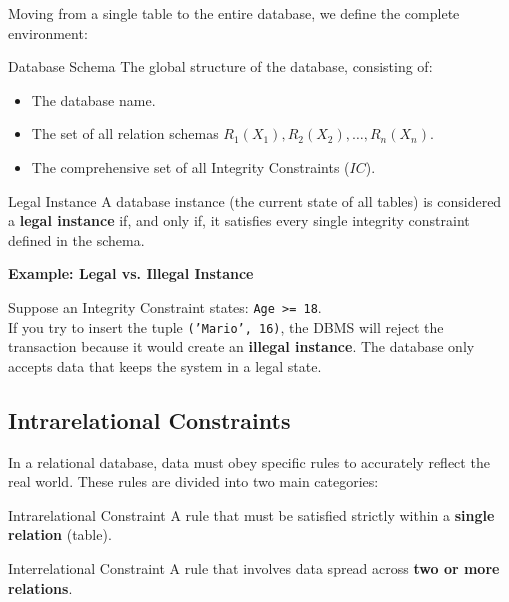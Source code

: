 Moving from a single table to the entire database, we define the complete environment:

\begin{defbox}{Database Schema}
The global structure of the database, consisting of:
\begin{itemize}
    \item The database name.
    \item The set of all relation schemas $R_1(X_1), R_2(X_2), \dots, R_n(X_n)$.
    \item The comprehensive set of all Integrity Constraints ($IC$).
\end{itemize}
\end{defbox}

\begin{defbox}{Legal Instance}
A database instance (the current state of all tables) is considered a \textbf{legal instance} if, and only if, it satisfies every single integrity constraint defined in the schema.
\end{defbox}

\vspace{0.2cm}
\begin{example}{\textbf{Example: Legal vs. Illegal Instance}}

Suppose an Integrity Constraint states: \texttt{Age >= 18}.\\
If you try to insert the tuple \texttt{('Mario', 16)}, the DBMS will reject the transaction because it would create an \textbf{illegal instance}. The database only accepts data that keeps the system in a legal state.
\end{example}

\subsection{Intrarelational Constraints}

In a relational database, data must obey specific rules to accurately reflect the real world. These rules are divided into two main categories:

\begin{defbox}{Intrarelational Constraint}
A rule that must be satisfied strictly within a \textbf{single relation} (table).
\end{defbox}

\begin{defbox}{Interrelational Constraint}
A rule that involves data spread across \textbf{two or more relations}.
\end{defbox}

